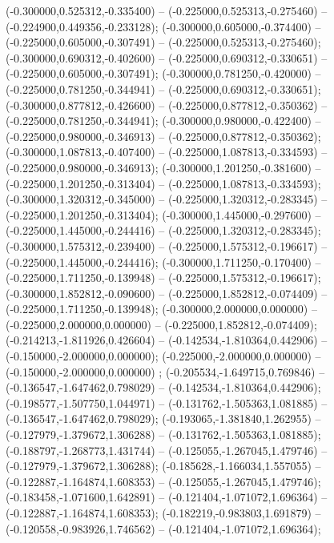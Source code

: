  (-0.300000,0.525312,-0.335400) -- (-0.225000,0.525313,-0.275460) -- (-0.224900,0.449356,-0.233128);
 (-0.300000,0.605000,-0.374400) -- (-0.225000,0.605000,-0.307491) -- (-0.225000,0.525313,-0.275460);
 (-0.300000,0.690312,-0.402600) -- (-0.225000,0.690312,-0.330651) -- (-0.225000,0.605000,-0.307491);
 (-0.300000,0.781250,-0.420000) -- (-0.225000,0.781250,-0.344941) -- (-0.225000,0.690312,-0.330651);
 (-0.300000,0.877812,-0.426600) -- (-0.225000,0.877812,-0.350362) -- (-0.225000,0.781250,-0.344941);
 (-0.300000,0.980000,-0.422400) -- (-0.225000,0.980000,-0.346913) -- (-0.225000,0.877812,-0.350362);
 (-0.300000,1.087813,-0.407400) -- (-0.225000,1.087813,-0.334593) -- (-0.225000,0.980000,-0.346913);
 (-0.300000,1.201250,-0.381600) -- (-0.225000,1.201250,-0.313404) -- (-0.225000,1.087813,-0.334593);
 (-0.300000,1.320312,-0.345000) -- (-0.225000,1.320312,-0.283345) -- (-0.225000,1.201250,-0.313404);
 (-0.300000,1.445000,-0.297600) -- (-0.225000,1.445000,-0.244416) -- (-0.225000,1.320312,-0.283345);
 (-0.300000,1.575312,-0.239400) -- (-0.225000,1.575312,-0.196617) -- (-0.225000,1.445000,-0.244416);
 (-0.300000,1.711250,-0.170400) -- (-0.225000,1.711250,-0.139948) -- (-0.225000,1.575312,-0.196617);
 (-0.300000,1.852812,-0.090600) -- (-0.225000,1.852812,-0.074409) -- (-0.225000,1.711250,-0.139948);
 (-0.300000,2.000000,0.000000) -- (-0.225000,2.000000,0.000000) -- (-0.225000,1.852812,-0.074409);
 (-0.214213,-1.811926,0.426604) -- (-0.142534,-1.810364,0.442906) -- (-0.150000,-2.000000,0.000000);
 (-0.225000,-2.000000,0.000000) -- (-0.150000,-2.000000,0.000000) ;
 (-0.205534,-1.649715,0.769846) -- (-0.136547,-1.647462,0.798029) -- (-0.142534,-1.810364,0.442906);
 (-0.198577,-1.507750,1.044971) -- (-0.131762,-1.505363,1.081885) -- (-0.136547,-1.647462,0.798029);
 (-0.193065,-1.381840,1.262955) -- (-0.127979,-1.379672,1.306288) -- (-0.131762,-1.505363,1.081885);
 (-0.188797,-1.268773,1.431744) -- (-0.125055,-1.267045,1.479746) -- (-0.127979,-1.379672,1.306288);
 (-0.185628,-1.166034,1.557055) -- (-0.122887,-1.164874,1.608353) -- (-0.125055,-1.267045,1.479746);
 (-0.183458,-1.071600,1.642891) -- (-0.121404,-1.071072,1.696364) -- (-0.122887,-1.164874,1.608353);
 (-0.182219,-0.983803,1.691879) -- (-0.120558,-0.983926,1.746562) -- (-0.121404,-1.071072,1.696364);
